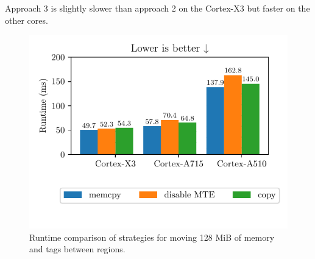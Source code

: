 Approach 3 is slightly slower than approach 2 on the Cortex-X3 but faster on the other cores.

\begin{figure}[h]
    \centering
    \includegraphics{plots/migrate}
    \caption{Runtime comparison of strategies for moving 128 MiB of memory and tags between regions.}
    \label{fig:migrate-performance}
\end{figure}
